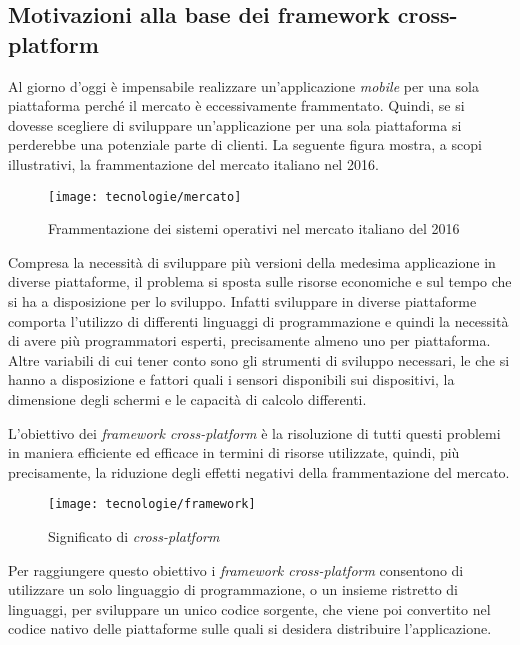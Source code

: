 \subsection{Motivazioni alla base dei framework cross-platform}

Al giorno d'oggi è impensabile realizzare un'applicazione \textit{mobile} per una sola piattaforma perché il mercato è eccessivamente frammentato. Quindi, se si dovesse scegliere di sviluppare un'applicazione per una sola piattaforma si perderebbe una potenziale parte di clienti. La seguente figura mostra, a scopi illustrativi, la frammentazione del mercato italiano nel 2016.

\begin{figure}[!h] 
    \centering 
    \texttt{[image: tecnologie/mercato]} 
    \caption{Frammentazione dei sistemi operativi nel mercato italiano del 2016}
\end{figure}

Compresa la necessità di sviluppare più versioni della medesima applicazione in diverse piattaforme, il problema si sposta sulle risorse economiche e sul tempo che si ha a disposizione per lo sviluppo. Infatti sviluppare in diverse piattaforme comporta l'utilizzo di differenti linguaggi di programmazione e quindi la necessità di avere più programmatori esperti, precisamente almeno uno per piattaforma. Altre variabili di cui tener conto sono gli strumenti di sviluppo necessari, le  che si hanno a disposizione e fattori quali i sensori disponibili sui dispositivi, la dimensione degli schermi e le capacità di calcolo differenti.

L'obiettivo dei \textit{framework cross-platform} è la risoluzione di tutti questi problemi in maniera efficiente ed efficace in termini di risorse utilizzate, quindi, più precisamente, la riduzione degli effetti negativi della frammentazione del mercato.

\begin{figure}[!h] 
    \centering 
    \texttt{[image: tecnologie/framework]} 
    \caption{Significato di \textit{cross-platform}}
\end{figure}

Per raggiungere questo obiettivo i \textit{framework cross-platform} consentono di utilizzare un solo linguaggio di programmazione, o un insieme ristretto di linguaggi, per sviluppare un unico codice sorgente, che viene poi convertito nel codice nativo delle piattaforme sulle quali si desidera distribuire l'applicazione. 

